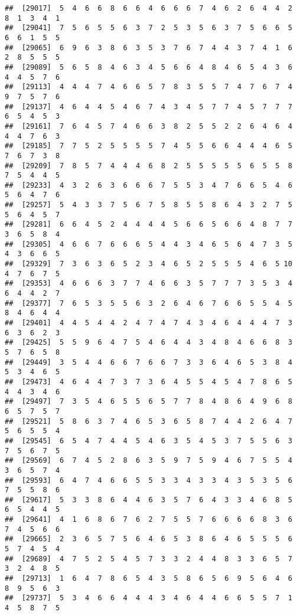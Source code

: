 \documentclass[
]{book}
\begin{document}
\begin{verbatim}
##  [29017]  5  4  6  6  8  6  6  4  6  6  6  7  4  6  2  6  4  4  2  8  1  3  4  1
##  [29041]  7  5  6  5  5  6  3  7  2  5  3  5  6  3  7  5  6  6  5  6  6  1  5  5
##  [29065]  6  9  6  3  8  6  3  5  3  7  6  7  4  4  3  7  4  1  6  2  8  5  5  5
##  [29089]  5  6  5  8  4  6  3  4  5  6  6  4  8  4  6  5  4  3  6  4  4  5  7  6
##  [29113]  4  4  4  7  4  6  6  5  7  8  3  5  5  7  4  7  6  7  4  9  7  5  7  6
##  [29137]  4  6  4  4  5  4  6  7  4  3  4  5  7  7  4  5  7  7  7  6  5  4  5  3
##  [29161]  7  6  4  5  7  4  6  6  3  8  2  5  5  2  2  6  4  6  4  4  4  7  6  3
##  [29185]  7  7  5  2  5  5  5  5  7  4  5  5  6  6  4  4  4  6  5  7  6  7  3  8
##  [29209]  7  8  5  7  4  4  4  6  8  2  5  5  5  5  5  6  5  5  8  7  5  4  4  5
##  [29233]  4  3  2  6  3  6  6  6  7  5  5  3  4  7  6  6  5  4  6  5  6  4  7  6
##  [29257]  5  4  3  3  7  5  6  7  5  8  5  5  8  6  4  3  2  7  5  5  6  4  5  7
##  [29281]  6  6  4  5  2  4  4  4  4  5  6  6  5  6  6  4  8  7  7  3  6  5  8  4
##  [29305]  4  6  6  7  6  6  6  5  4  4  3  4  6  5  6  4  7  3  5  4  3  6  6  5
##  [29329]  7  3  6  3  6  5  2  3  4  6  5  2  5  5  5  4  6  5 10  4  7  6  7  5
##  [29353]  4  6  6  6  3  7  7  4  6  6  3  5  7  7  7  3  5  3  4  6  4  4  2  7
##  [29377]  7  6  5  3  5  5  6  3  2  6  4  6  7  6  6  5  5  4  5  8  4  6  4  4
##  [29401]  4  4  5  4  4  2  4  7  4  7  4  3  4  6  4  4  4  7  3  6  3  6  2  3
##  [29425]  5  5  9  6  4  7  5  4  6  4  4  3  4  8  4  6  6  8  3  5  7  6  5  8
##  [29449]  3  5  4  4  6  6  7  6  6  7  3  3  6  4  6  5  3  8  4  5  3  4  6  5
##  [29473]  4  6  4  4  7  3  7  3  6  4  5  5  4  5  4  7  8  6  5  4  4  3  4  6
##  [29497]  7  3  5  4  6  5  5  6  5  7  7  8  4  8  6  4  9  6  8  6  5  7  5  7
##  [29521]  5  8  6  3  7  4  6  5  3  6  5  8  7  4  4  2  6  4  7  5  6  5  5  4
##  [29545]  6  5  4  7  4  4  5  4  6  3  5  4  5  3  7  5  5  6  3  7  5  6  7  5
##  [29569]  6  7  4  5  2  8  6  3  5  9  7  5  9  4  6  7  5  5  4  3  6  5  7  4
##  [29593]  6  4  7  4  6  6  5  5  3  3  4  3  3  4  3  5  3  5  6  7  5  5  8  6
##  [29617]  5  3  3  8  6  4  4  6  3  5  7  6  4  3  3  4  6  8  5  6  5  4  4  5
##  [29641]  4  1  6  8  6  7  6  2  7  5  5  7  6  6  6  6  8  3  6  7  4  5  6  6
##  [29665]  2  3  6  5  7  5  6  4  6  5  3  8  6  4  6  5  5  5  6  5  7  4  5  4
##  [29689]  4  7  5  2  5  4  5  7  3  3  2  4  4  8  3  3  6  5  7  3  2  4  8  5
##  [29713]  1  6  4  7  8  6  5  4  3  5  8  6  5  6  9  5  6  4  6  8  9  5  6  3
##  [29737]  5  3  4  6  6  4  4  4  3  4  6  4  4  6  6  5  5  7  1  4  5  8  7  5

\end{verbatim}
\end{document}
